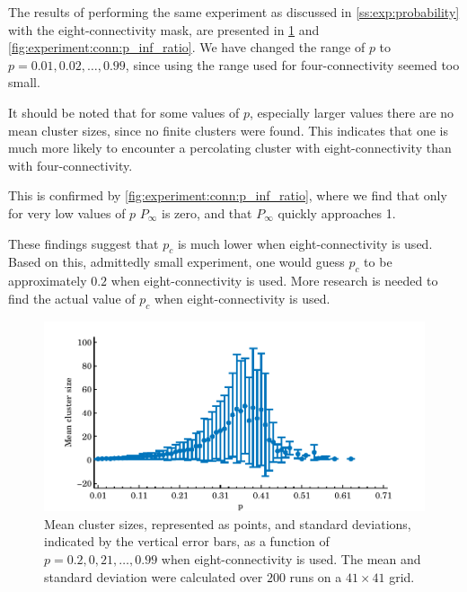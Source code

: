 The results of performing the same experiment as discussed in \cref{ss:exp:probability} with the eight-connectivity mask, are presented in \cref{fig:experiment:conn:mean_std_clusters} and \ref{fig:experiment:conn:p_inf_ratio}. We have changed the range of $p$ to $p = 0.01, 0.02, \dotsc, 0.99$, since using the range used for four-connectivity seemed too small.

It should be noted that for some values of $p$, especially larger values there are no mean cluster sizes, since no finite clusters were found. This indicates that one is much more likely to encounter a percolating cluster with eight-connectivity than with four-connectivity.  

This is confirmed by \cref{fig:experiment:conn:p_inf_ratio}, where we find that only for very low values of $p$ $P_\infty$ is zero, and that $P_\infty$ quickly approaches 1. 

These findings suggest that $p_c$ is much lower when eight-connectivity is used. Based on this, admittedly small experiment, one would guess $p_c$ to be approximately $0.2$ when eight-connectivity is used. More research is needed to find the actual value of $p_c$ when eight-connectivity is used.\\

\begin{figure}
	\centering
	\includegraphics[width=\textwidth]{./img/assignment_d_mean_std_p.pdf}
	\caption{Mean cluster sizes, represented as points, and standard deviations, indicated by the vertical error bars, as a function of $p = 0.2, 0,21, \dotsc, 0.99$ when eight-connectivity is used. The mean and standard deviation were calculated over $200$ runs on a $41 \times 41$ grid.}
	\label{fig:experiment:conn:mean_std_clusters}
\end{figure}

